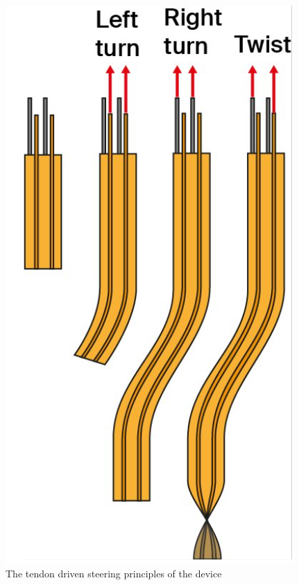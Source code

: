 \begin{figure}
    \centering
    \includegraphics[width=\linewidth]{images/Hardware/steering.PNG}
    \caption{The tendon driven steering principles of the device}
    \label{fig:steering}
\end{figure}

